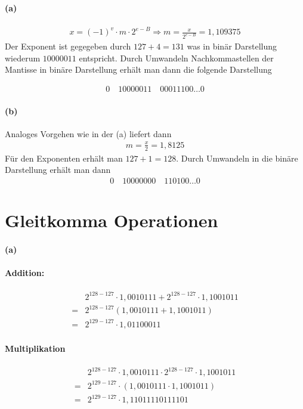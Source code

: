 \documentclass[a4paper]{article}
\begin{document}
\paragraph{(a)}
\begin{align*}
    x=(-1)^v\cdot m \cdot2^{e-B} \Rightarrow m=\frac{x}{2^{e-B}}=1,109375
\end{align*}
Der Exponent ist gegegeben durch $127+4=131$ was in binär Darstellung wiederum $10000011$ entspricht. Durch Umwandeln Nachkommastellen der Mantisse in binäre Darstellung erhält man dann die folgende Darstellung

\begin{align*}
    0 \quad 10000011 \quad 00011100\dots 0
\end{align*}

\paragraph{(b)}
Analoges Vorgehen wie in der (a) liefert dann
\begin{align*}
    m=\frac{x}{2}=1,8125
\end{align*}
Für den Exponenten erhält man $127+1=128$. Durch Umwandeln in die binäre Darstellung erhält man dann
\begin{align*}
    0 \quad 10000000 \quad 110100\dots 0
\end{align*}


\section{Gleitkomma Operationen}
\paragraph{(a)}
\paragraph{Addition:}
\begin{align*}
    &2^{128-127}\cdot 1,0010111+2^{128-127}\cdot1,1001011\\
    =&2^{128-127}(1,0010111+1,1001011)\\
    =&2^{129-127}\cdot 1,01100011
\end{align*}

\paragraph{Multiplikation}
\begin{align*}
    &2^{128-127}\cdot 1,0010111 \cdot 2^{128-127}\cdot1,1001011\\
    =&2^{129-127}\cdot(1,0010111\cdot 1,1001011)\\
    =&2^{129-127}\cdot 1,11011110111101
\end{align*}
\end{document}
